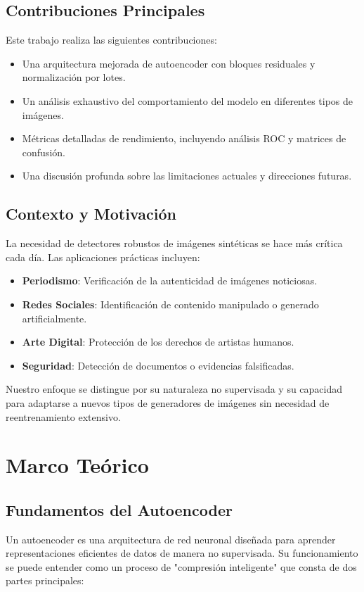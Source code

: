 \documentclass[conference]{IEEEtran}
\begin{document}
\subsection{Contribuciones Principales}
Este trabajo realiza las siguientes contribuciones:

\begin{itemize}
    \item Una arquitectura mejorada de autoencoder con bloques residuales y normalización por lotes.
    \item Un análisis exhaustivo del comportamiento del modelo en diferentes tipos de imágenes.
    \item Métricas detalladas de rendimiento, incluyendo análisis ROC y matrices de confusión.
    \item Una discusión profunda sobre las limitaciones actuales y direcciones futuras.
\end{itemize}

\subsection{Contexto y Motivación}
La necesidad de detectores robustos de imágenes sintéticas se hace más crítica cada día. Las aplicaciones prácticas incluyen:

\begin{itemize}
    \item \textbf{Periodismo}: Verificación de la autenticidad de imágenes noticiosas.
    \item \textbf{Redes Sociales}: Identificación de contenido manipulado o generado artificialmente.
    \item \textbf{Arte Digital}: Protección de los derechos de artistas humanos.
    \item \textbf{Seguridad}: Detección de documentos o evidencias falsificadas.
\end{itemize}

Nuestro enfoque se distingue por su naturaleza no supervisada y su capacidad para adaptarse a nuevos tipos de generadores de imágenes sin necesidad de reentrenamiento extensivo.

\section{Marco Teórico}
\subsection{Fundamentos del Autoencoder}
Un autoencoder es una arquitectura de red neuronal diseñada para aprender representaciones eficientes de datos de manera no supervisada. Su funcionamiento se puede entender como un proceso de "compresión inteligente" que consta de dos partes principales:
\end{document}
